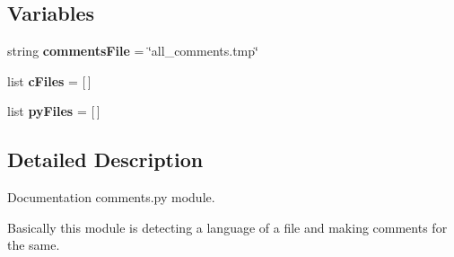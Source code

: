 \subsection*{Variables}
\begin{DoxyCompactItemize}
\item 
\mbox{\label{namespacecomments_a7c7525230c1c8e02fe82528f42a261ff}} 
string {\bfseries comments\+File} = \char`\"{}all\+\_\+comments.\+tmp\char`\"{}
\item 
\mbox{\label{namespacecomments_a2bce2a29cef93da884bbd3ed4feb4102}} 
list {\bfseries c\+Files} = \mbox{[}$\,$\mbox{]}
\item 
\mbox{\label{namespacecomments_a8b70fa6577cccac3842d7a3124a19f4c}} 
list {\bfseries py\+Files} = \mbox{[}$\,$\mbox{]}
\end{DoxyCompactItemize}


\subsection{Detailed Description}
Documentation comments.\+py module. 

Basically this module is detecting a language of a file and making comments for the same. 